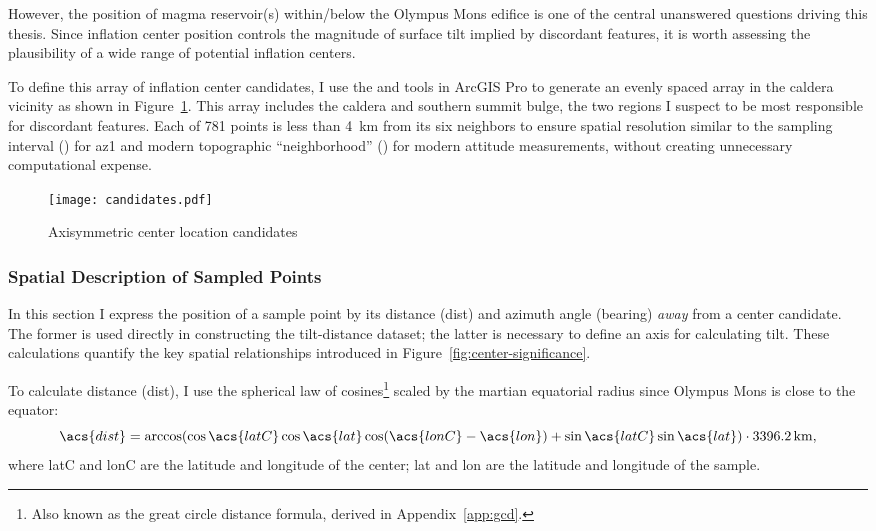 However, the position of magma reservoir(s) within/below the Olympus Mons edifice is one of the central unanswered questions driving this thesis. Since inflation center position controls the magnitude of surface tilt implied by discordant features, it is worth assessing the plausibility of a wide range of potential inflation centers.

To define this array of inflation center candidates, I use the  and  tools in ArcGIS Pro to generate an evenly spaced array in the caldera vicinity as shown in Figure~\ref{fig:candidates}. This array includes the caldera and southern summit bulge, the two regions I suspect to be most responsible for discordant features. Each of 781 points is less than \qty{4}{\km} from its six neighbors to ensure spatial resolution similar to the sampling interval (\samplinginterval) for \acl{az1} and modern topographic ``neighborhood'' (\neighborhood) for modern attitude measurements, without creating unnecessary computational expense.

\begin{figure}
    \texttt{[image: candidates.pdf]}%
    \caption{Axisymmetric center location candidates}%
    \label{fig:candidates}
\end{figure}

\subsubsection{Spatial Description of Sampled Points}

In this section I express the position of a sample point by its distance (\acs{dist}) and azimuth angle (\acs{bearing}) \emph{away} from a center candidate. The former is used directly in constructing the tilt-distance dataset; the latter is necessary to define an axis for calculating tilt. These calculations quantify the key spatial relationships introduced in Figure~\ref{fig:center-significance}.

To calculate distance (\acs{dist}), I use the spherical law of cosines\footnote{Also known as the great circle distance formula, derived in Appendix~\ref{app:gcd}.} scaled by the martian equatorial radius since Olympus Mons is close to the equator:
\begin{equation}
    \acs{dist}=\arccos(\cos\acs{latC}\cos\acs{lat}\cos(\acs{lonC}-\acs{lon}) + \sin\acs{latC}\sin\acs{lat})\cdot\qty{3396.2}{\km},
\end{equation}
where \acs{latC} and \acs{lonC} are the latitude and longitude of the center; \acs{lat} and \acs{lon} are the latitude and longitude of the sample.

